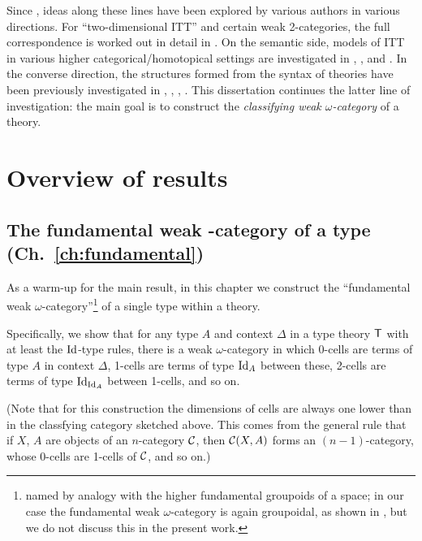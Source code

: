 \begin{para}
Since \cite{hofmann-streicher}, ideas along these lines have been explored by various authors in various directions.  For ``two-dimensional ITT'' and certain weak 2-categories, the full correspondence is worked out in detail in \cite{garner:2-d-models}.  On the semantic side, models of ITT in various higher categorical/homotopical settings are investigated in \cite{awodey-warren}, \cite{warren:thesis}, and \cite{garner-van-den-berg:top-and-simp-models}.  In the converse direction, the structures formed from the syntax of theories have been previously investigated in \cite{gambino-garner}, \cite{lumsdaine:weak-w-cats-from-itt-lmcs}, \cite{garner-van-den-berg}, \cite{awodey-hofstra-warren}.  This dissertation continues the latter line of investigation: the main goal is to construct the \emph{classifying weak $\omega$-category} of a theory.
\end{para}


\section{Overview of results}

\subsection*{The fundamental weak \pdfomega-category of a type (Ch.~\ref{ch:fundamental})}

\begin{para} \label{para:fundamental-sketch} As a warm-up for the main result, in this chapter we construct the ``fundamental weak $\omega$-category''\footnote{named by analogy with the higher fundamental groupoids of a space; in our case the fundamental weak $\omega$-category is again groupoidal, as shown in \cite{garner-van-den-berg}, but we do not discuss this in the present work.} of a single type within a theory.  

Specifically, we show that for any type $A$ and context $\Delta$ in a type theory $\mathsf{T}$ with at least the $\mathrm{Id}$-type rules, there is a weak $\omega$-category in which 0-cells are terms of type $A$ in context $\Delta$, 1-cells are terms of type $\mathrm{Id}_A$ between these, 2-cells are terms of type $\mathrm{Id}_{\mathrm{Id}_A}$ between 1-cells, and so on.

(Note that for this construction the dimensions of cells are always one lower than in the classfying category sketched above.  This comes from the general rule that if $X$, $A$ are objects of an $n$-category $\mathcal{C}$, then $\mathcal{C}(X,A)$ forms an $(n-1)$-category, whose 0-cells are 1-cells of $\mathcal{C}$, and so on.)
\end{para}

